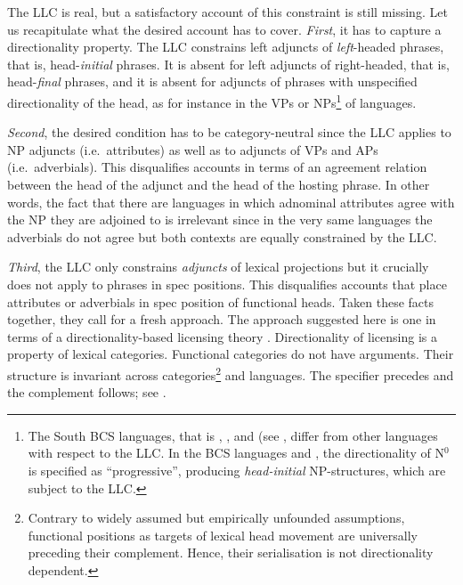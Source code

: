 \documentclass[output=paper
  ,nobabel
  ,uniformtopskip %
]{langscibook}
\begin{document}
The LLC is real, but a satisfactory account of this constraint is still missing. Let us recapitulate what the desired account has to cover. \emph{First}, it has to capture a directionality property. The LLC constrains left adjuncts of \emph{left}-headed phrases, that is, head-\emph{initial} phrases. It is absent for left adjuncts of right-headed, that is, head-\emph{final} phrases, and it is absent for adjuncts of phrases with unspecified directionality of the head, as for instance in the VPs or NPs\footnote{The South  BCS languages, that is , ,  and  (see \citet{SzucsichHaider2015}, differ from other  languages with respect to the LLC. In the BCS languages and , the directionality of N$^0$ is specified as ``progressive'', producing \emph{head-initial} NP-structures, which are subject to the LLC.}  of  languages.

\emph{Second}, the desired condition has to be category-neutral since the LLC applies to NP adjuncts (i.e.\ attributes) as well as to adjuncts of VPs and APs (i.e.\ adverbials). This disqualifies accounts in terms of an agreement relation between the head of the adjunct and the head of the hosting phrase. In other words, the fact that there are languages in which adnominal attributes agree with the NP they are adjoined to is irrelevant since in the very same languages the adverbials do not agree but both contexts are equally constrained by the LLC.

\emph{Third}, the LLC only constrains \emph{adjuncts} of lexical projections but it crucially does not apply to phrases in spec positions. This disqualifies accounts that place attributes or adverbials in spec position of functional heads. Taken these facts together, they call for a fresh approach. The approach suggested here is one in terms of a directionality-based licensing theory \citep{Haider2013,Haider2015}. Directionality of licensing is a property of lexical categories. Functional categories do not have arguments. Their structure is invariant across categories\footnote{Contrary to widely assumed but empirically unfounded assumptions, functional positions as targets of lexical head movement are universally preceding their complement. Hence, their serialisation is not  directionality dependent.}  and languages. The specifier precedes and the complement follows; see \citet{Haider2013,Haider2015}.
\end{document}
